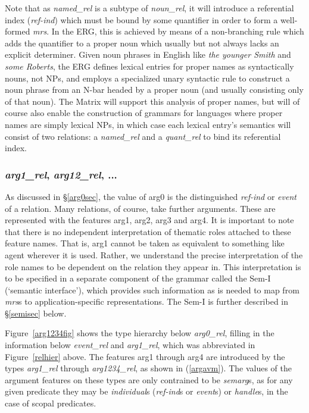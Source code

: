 \documentclass[12pt]{article}
\begin{document}
Note that as {\it named\_rel} is a subtype of {\it noun\_rel}, it
will introduce a referential index ({\it ref-ind}) which must
be bound by some quantifier in order to form a well-formed {\it mrs}.
In the ERG, this is achieved by means of a non-branching rule
which adds the quantifier to a proper noun which usually but not always
lacks an explicit determiner.  Given noun phrases in English like {\it the
younger Smith} and {\it some Roberts}, the ERG defines lexical entries
for proper names as syntactically nouns, not NPs, and employs a specialized
unary syntactic rule to construct a noun phrase from an N-bar headed by
a proper noun (and usually consisting only of that noun).  The Matrix will
support this analysis of proper names, but will of course also enable the
construction of grammars for languages where proper names are simply lexical 
NPs, in which case each lexical entry's semantics will consist of two
relations: a {\it named\_rel} and a {\it quant\_rel} to bind its referential
index.

\subsubsection{{\it arg1\_rel}, {\it arg12\_rel}, ...}

As discussed in \S\ref{arg0sec}, the value of {\sc arg0} is the
distinguished {\it ref-ind} or {\it event} of a relation.  Many
relations, of course, take further arguments.  These are represented
with the features {\sc arg1}, {\sc arg2}, {\sc arg3} and {\sc arg4}.
It is important to note that there is no independent interpretation
of thematic roles attached to these feature names.  That is, {\sc arg1} 
cannot be taken as equivalent to something like {\sc agent} wherever 
it is used.
Rather, we understand the precise interpretation of the role names to
be dependent on the relation they appear in.  This interpretation is
to be specified in a separate component of the grammar called the
Sem-I (`semantic interface'), which provides such information as is
needed to map from {\it mrs}s to application-specific representations.
The Sem-I is further described in \S\ref{semisec} below.

Figure~\ref{arg1234fig} shows the type hierarchy below {\it arg0\_rel},
filling in the information below {\it event\_rel} and {\it arg1\_rel},
which was abbreviated in Figure~\ref{relhier} above.  The features
{\sc arg1} through {\sc arg4} are introduced by the types {\it
arg1\_rel} through {\it arg1234\_rel}, as shown in (\ref{argavm}).
The values of the argument features on these types are only
contrained to be {\it semarg}s, as for any given predicate
they may be {\it individual}s ({\it ref-ind}s or {\it event}s) or
{\it handle}s, in the case of scopal predicates.
\end{document}
